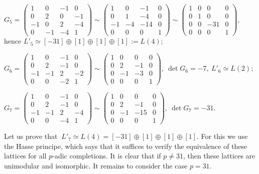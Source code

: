 \documentclass[14pt]{article}
\begin{document}
\begin{small}
\vskip 0.4cm
$
G_{5} =
\begin{pmatrix}
1 & 0 & -1 & 0\\
0 & 2 & 0 & -1\\
-1 & 0 & 2 & -4\\
0 & -1 & -4& 1
\end{pmatrix} \sim
\begin{pmatrix}
1 & 0 & -1 & 0\\
0 & 1 & -4 & 0\\
-1 & -4 & -14 & 0\\
0 & 0 & 0 & 1
\end{pmatrix}
\sim
\begin{pmatrix}
1 & 0 & 0 & 0\\
0 & 1 & 0 & 0\\
0 & 0 & -31 & 0\\
0 & 0 & 0 & 1
\end{pmatrix},
$
\vskip 0.4cm
hence
$L'_5 \simeq [-31] \oplus [1] \oplus [1] \oplus [1] := L(4);$

\vskip 0.4cm
$
G_{6} =
\begin{pmatrix}
1 & 0 & -1 & 0\\
0 & 2 & -1 & 0\\
-1 & -1 & 2 & -2\\
0 &0 & -2 & 1
\end{pmatrix} \sim
\begin{pmatrix}
1 & 0 & 0 & 0\\
0 & 2 & -1 & 0\\
0 & -1 & -3 & 0\\
0 & 0 & 0 & 1
\end{pmatrix}, \ \det G_6 = -7, \ L'_6 \simeq L(2);
$


\vskip 0.4cm
$
G_{7} =
\begin{pmatrix}
1 & 0 & -1 & 0\\
0 & 2 & -1 & 0\\
-1 & -1 & 2 & -4\\
0 & 0 & -4 & 1
\end{pmatrix} \sim
\begin{pmatrix}
1 & 0 & 0 & 0\\
0 & 2 & -1 & 0\\
0 & -1 & -15 & 0\\
0 & 0 & 0 & 1
\end{pmatrix}, \ \det G_7 = -31.$
\vskip 0.4cm

Let us prove that $\ L'_7 \simeq L(4) = [-31] \oplus [1] \oplus [1] \oplus [1]$.
For this we use the Hasse principe,
which says that it suffices to verify the equivalence
of these lattices  for all $p$-adic completions.
It is clear that if $p \not = 31$, then these lattices
are unimodular and isomorphic.
It remains to consider the case $p = 31$.


\end{small}
\end{document}
